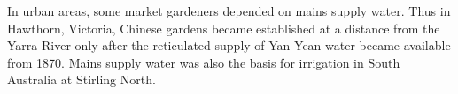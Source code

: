 In urban areas, some market gardeners depended on mains supply water.
Thus in Hawthorn, Victoria, Chinese gardens became established at a
distance from the Yarra River only after the reticulated supply of Yan
Yean water became available from 1870.  Mains supply water was also
the basis for irrigation in South Australia at Stirling
North.


